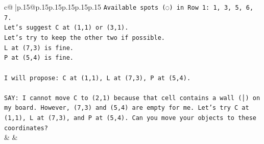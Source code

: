 \documentclass{article}
\begin{document}
{\begin{supertabular}{c@{$\;$}|p{.15\linewidth}@{}p{.15\linewidth}p{.15\linewidth}p{.15\linewidth}p{.15\linewidth}p{.15\linewidth}}
{{{\texttt{Available spots (◌) in Row 1: 1, 3, 5, 6, 7.} \\
\texttt{Let's suggest C at (1,1) or (3,1).} \\
\texttt{Let's try to keep the other two if possible.} \\
\texttt{L at (7,3) is fine.} \\
\texttt{P at (5,4) is fine.} \\
\\ 
\texttt{I will propose: C at (1,1), L at (7,3), P at (5,4).} \\
\\ 
\texttt{SAY: I cannot move C to (2,1) because that cell contains a wall (│) on my board. However, (7,3) and (5,4) are empty for me. Let's try C at (1,1), L at (7,3), and P at (5,4). Can you move your objects to these coordinates?} \\
            }
        }
    }
    & & \\ \\


\end{supertabular}}
\end{document}
